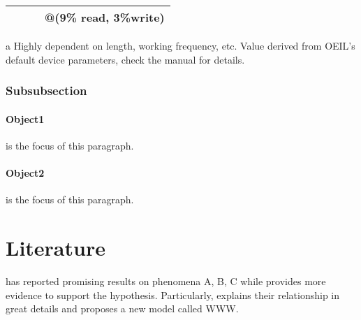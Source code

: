 \documentclass[../template.tex]{subfiles}
\begin{document}
\begin{table}[!htb]
\begin{adjustbox}{max width=\textwidth}
\begin{threeparttable}
\begin{tabular}{l r r r}
				&                           &                                 & @(9\% read, 3\%write)          \\ \bottomrule
			\end{tabular}
			\begin{tablenotes}
				\newcommand{\CORNERSTONE}{\href{run:./appendix/CORNERSTONE-Standard-Components-Library-SOI.pdf}{CORNERSTONE}}
				\scriptsize
				\item [a] Highly dependent on length, working frequency, etc. Value derived from OEIL's default device parameters, check the manual for details.
			\end{tablenotes}
		\end{threeparttable}
	\end{adjustbox}
\end{table}

\subsubsection{Subsubsection}

\paragraph{Object1} is the focus of this paragraph. \blindtext

\paragraph{Object2} is the focus of this paragraph. \blindtext

\section{Literature}

\cite{A, B, G} has reported promising results on phenomena A, B, C while \cite{G} provides more evidence to support the hypothesis. Particularly, \citep[Sec.~III]{G} explains their relationship in great details and proposes a new model called WWW.
\end{document}

